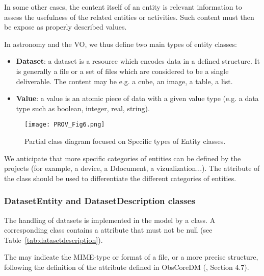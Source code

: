 In some other cases, the content itself of an entity is relevant information to assess the usefulness of the related entities or activities. Such content must then be expose as properly described values.

In astronomy and the VO, we thus define two main types of entity classes:

\begin{itemize}
    \item \textbf{Dataset}: a dataset is a resource which encodes data in a defined structure. It is generally a file or a set of files which are considered to be a single deliverable. The content may be e.g. a cube, an image, a table, a list.
    \item \textbf{Value}: a value is an atomic piece of data with a given value type (e.g. a data type such as boolean, integer, real, string).
\end{itemize}


\begin{figure}[ht]
\centering
\texttt{[image: PROV\_Fig6.png]}
\caption[Partial class diagram focused on specific types of Entity classes.]{Partial class diagram focused on Specific types of Entity classes.}
\label{fig:classdiagram_entityclasses}
\end{figure}

We anticipate that more specific categories of entities can be defined by the projects (for example, a device, a Ddocument, a vizualization...). The  attribute of the  class should be used to differentiate the different categories of entities.


\subsubsection{DatasetEntity and DatasetDescription classes}

The handling of datasets is implemented in the model by a  class. A corresponding  class contains a  attribute that must not be null (see Table~\ref{tab:datasetdescription}).

The  may indicate the MIME-type or format of a file, or a more precise structure, following the definition of the attribute  defined in ObsCoreDM (\citet{2017ivoa.spec.0509L}, Section 4.7).

